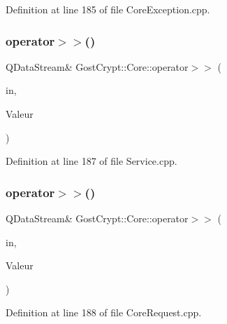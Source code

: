 Definition at line 185 of file Core\+Exception.\+cpp.

\mbox{\label{namespace_gost_crypt_1_1_core_aa650a723ad65de7117bacb1f06e9a1a0}} 
\subsubsection{\texorpdfstring{operator$>$$>$()}{operator>>()}\hspace{0.1cm}{\footnotesize\ttfamily [31/56]}}
{\footnotesize\ttfamily Q\+Data\+Stream\& Gost\+Crypt\+::\+Core\+::operator$>$$>$ (\begin{DoxyParamCaption}\item[{Q\+Data\+Stream \&}]{in,  }\item[{\hyperlink{struct_gost_crypt_1_1_core_1_1_exception_response}{Exception\+Response} \&}]{Valeur }\end{DoxyParamCaption})}



Definition at line 187 of file Service.\+cpp.

\mbox{\label{namespace_gost_crypt_1_1_core_ae557c3a7cf37642396e71a7e8af96acf}} 
\subsubsection{\texorpdfstring{operator$>$$>$()}{operator>>()}\hspace{0.1cm}{\footnotesize\ttfamily [32/56]}}
{\footnotesize\ttfamily Q\+Data\+Stream\& Gost\+Crypt\+::\+Core\+::operator$>$$>$ (\begin{DoxyParamCaption}\item[{Q\+Data\+Stream \&}]{in,  }\item[{\hyperlink{struct_gost_crypt_1_1_core_1_1_dismount_volume_request}{Dismount\+Volume\+Request} \&}]{Valeur }\end{DoxyParamCaption})}



Definition at line 188 of file Core\+Request.\+cpp.

\mbox{\label{namespace_gost_crypt_1_1_core_af76f2cc4a0ec25c20c63482b879c92b6}} 
